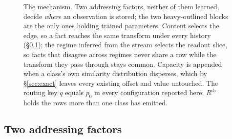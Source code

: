 \documentclass[11pt,a4paper]{article}
\begin{document}
\begin{figure}[t]
\caption{The mechanism. Two addressing factors, neither of them learned, decide
\emph{where} an observation is stored; the two heavy-outlined blocks are the
only ones holding trained parameters. Content selects the edge, so a fact
reaches the same transform under every history (\S\ref{sec:addressing}); the
regime inferred from the stream selects the readout slice, so facts that
disagree across regimes never share a row while the transform they pass through
stays common. Capacity is appended when a class's own similarity distribution
disperses, which by \S\ref{sec:exact} leaves every existing offset and value
untouched. The routing key $q$ equals $p_0$ in every configuration reported
here; $R^{\mathrm{sh}}$ holds the rows more than one class has emitted.}
\label{fig:mech}
\end{figure}

\subsection{Two addressing factors}
\label{sec:addressing}
\end{document}
